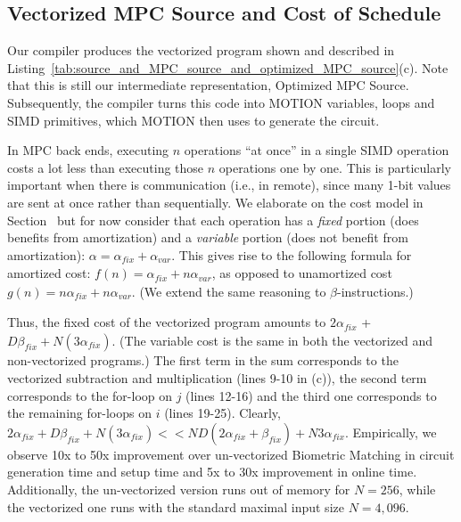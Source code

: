 \subsection{Vectorized MPC Source and Cost of Schedule}

Our compiler produces the vectorized program shown and described in 
Listing~\ref{tab:source_and_MPC_source_and_optimized_MPC_source}(c).
Note that this is still our intermediate representation, Optimized MPC Source. Subsequently,
the compiler turns this code into MOTION variables, loops and SIMD primitives, which MOTION then
uses to generate the circuit.
\begin{comment}
The compiler determines that SUB and MUL in ``naive'' MPC Source (lines 9 and 10 in (b))
can be fully vectorized into the SIMD SUB and MUL in optimized MPC Source (lines 9 and 10 in (c)).
Notation {\sf p[I,J]} denotes a 2-dimensional array with fully vectorized dimensions.
The computation of sum (line 11 in (b))
is sequential across the $j$-dimension, but it is parallel across the $i$-dimension.
The loop in lines 12-16 in (c) illustrates; here {\sf p[I,j]} refers to the $j$-th column in {\sf p}.
Unfortunately, CMP and MUX remain sequential.
\end{comment}

In MPC back ends, executing $n$ operations ``at once'' in a single SIMD operation costs a lot less than executing those $n$ operations one by one.
This is particularly important when there is communication (i.e., in remote), since many 1-bit values are sent at once rather than sequentially.
We elaborate on the cost model in Section~ but for now consider that
each operation has a \emph{fixed} portion (does benefits from amortization) and
a \emph{variable} portion (does not benefit from amortization): $\alpha = \alpha_\mathit{fix} + \alpha_\mathit{var}$.
This gives rise to the following formula for amortized cost: $f(n) = \alpha_\mathit{fix} + n\alpha_\mathit{var}$,
as opposed to unamortized cost $g(n) = n\alpha_\mathit{fix} + n\alpha_\mathit{var}$. (We extend the same reasoning to
$\beta$-instructions.)

Thus, the fixed cost of the vectorized program amounts to
$2\alpha_\mathit{fix}$ + $D \beta_\mathit{fix} + N(3\alpha_\mathit{fix})$. (The variable cost is the same in both the vectorized and non-vectorized programs.)
The first term in the sum corresponds to the vectorized
subtraction and multiplication (lines 9-10 in (c)), the second term corresponds to the for-loop on $j$ (lines 12-16) and the third
one corresponds to the remaining for-loops on $i$ (lines 19-25). 
Clearly, $2\alpha_\mathit{fix} + D\beta_\mathit{fix} + N(3\alpha_\mathit{fix}) << ND(2\alpha_\mathit{fix}+\beta_\mathit{fix}) + N3\alpha_\mathit{fix}$.
Empirically, we observe 10x to 50x improvement over un-vectorized Biometric Matching in circuit generation time and setup time and 5x to 30x improvement in online time.
Additionally, the un-vectorized version runs out of memory for $N=256$, while the vectorized one runs with the standard maximal input size $N=4,096$.
